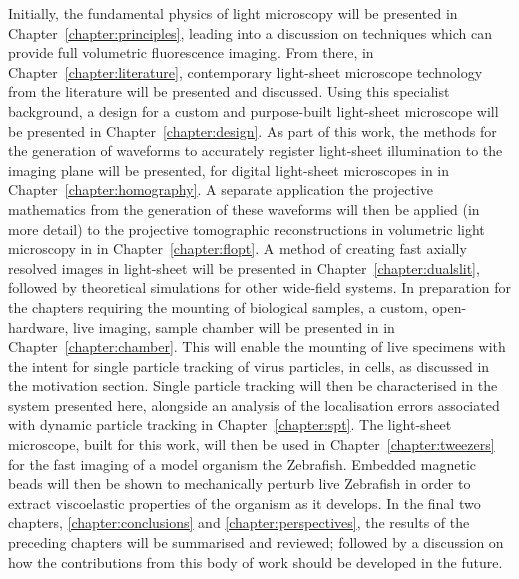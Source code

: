Initially, the fundamental physics of light microscopy will be presented in Chapter~\ref{chapter:principles}, leading into a discussion on techniques which can provide full volumetric fluorescence imaging.
From there, in Chapter~\ref{chapter:literature}, contemporary light-sheet microscope technology from the literature will be presented and discussed.
Using this specialist background, a design for a custom and purpose-built light-sheet microscope will be presented in Chapter~\ref{chapter:design}.
As part of this work, the methods for the generation of waveforms to accurately register light-sheet illumination to the imaging plane will be presented, for digital light-sheet microscopes in in Chapter~\ref{chapter:homography}.
A separate application the projective mathematics from the generation of these waveforms will then be applied (in more detail) to the projective tomographic reconstructions in volumetric light microscopy in in Chapter~\ref{chapter:flopt}.
A method of creating fast axially resolved images in light-sheet will be presented in Chapter~\ref{chapter:dualslit}, followed by theoretical simulations for other wide-field systems.
In preparation for the chapters requiring the mounting of biological samples, a custom, open-hardware, live imaging, sample chamber will be presented in in Chapter~\ref{chapter:chamber}.
This will enable the mounting of live specimens with the intent for single particle tracking of virus particles, in cells, as discussed in the motivation section.
Single particle tracking will then be characterised in the system presented here, alongside an analysis of the localisation errors associated with dynamic particle tracking in Chapter~\ref{chapter:spt}.
The light-sheet microscope, built for this work, will then be used in Chapter~\ref{chapter:tweezers} for the fast imaging of a model organism the Zebrafish.
Embedded magnetic beads will then be shown to mechanically perturb live Zebrafish in order to extract viscoelastic properties of the organism as it develops.
In the final two chapters, \ref{chapter:conclusions} and \ref{chapter:perspectives}, the results of the preceding chapters will be summarised and reviewed; followed by a discussion on how the contributions from this body of work should be developed in the future.

